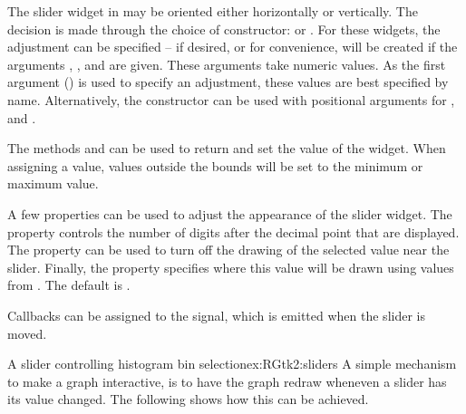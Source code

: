 The slider widget in \GTK\/ may be oriented either horizontally or
vertically. The decision
is made through the choice of constructor:  or
. For these widgets, the adjustment can be
specified -- if desired, or for convenience, will be created if the arguments
, , and
 are given.  These arguments take  numeric
values. As the first argument () is
used to specify an adjustment,
these values are best specified by name. Alternatively, the
 constructor can be used with
positional arguments for ,  and .


The methods  and
 can be used to return and set the value of
the widget. When assigning a value, values outside the bounds will be
set to the minimum or maximum value.

A few properties can be used to adjust the appearance of the slider widget.
The  property controls the number of digits after the
decimal point that are displayed.  The property  can be
used to turn off the drawing of the selected value near the
slider. Finally, the property  specifies where this
value will be drawn using values from . The
default is .

Callbacks can be assigned to the  signal, which is
emitted when the slider is moved.

\begin{example}{A slider controlling histogram bin selection}{ex:RGtk2:sliders}
  A simple mechanism to make a graph interactive, is to have the
  graph redraw wheneven a slider has its value changed. The following
  shows how this can be achieved.
\begin{Schunk}
\end{Schunk}
\end{example}


